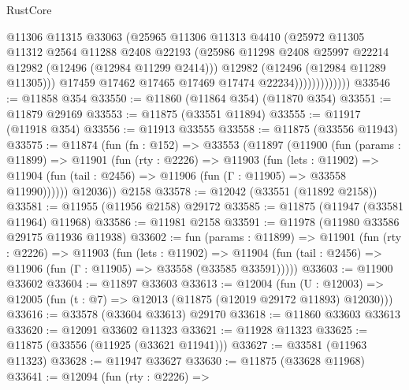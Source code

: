 \begin{lexlean}{RustCore}
\begin{coremodule}
                            @11306
                            @11315
                            @33063
                            (@25965
                              @11306
                              @11313
                              @4410
                              (@25972
                                @11305
                                @11312
                                @2564
                                @11288
                                @2408
                                @22193
                                (@25986
                                  @11298
                                  @2408
                                  @25997
                                  @22214
                                  @12982
                                  (@12496 (@12984 @11299 @2414)))
                                @12982
                                (@12496 (@12984 @11289 @11305)))
                              @17459
                              @17462
                              @17465
                              @17469
                              @17474
                              @22234)))))))))))))
@33546 := @11858 @354
@33550 := @11860 (@11864 @354) (@11870 @354)
@33551 := @11879 @29169
@33553 := @11875 (@33551 @11894)
@33555 := @11917 (@11918 @354)
@33556 := @11913 @33555
@33558 := @11875 (@33556 @11943)
@33575 := @11874
    (fun (fn : @152) =>
    @33553
      (@11897
        (@11900
          (fun (params : @11899) =>
          @11901
            (fun (rty : @2226) =>
            @11903
              (fun (lets : @11902) =>
              @11904 (fun (tail : @2456) => @11906 (fun (Γ : @11905) => @33558 @11990))))))
        @12036))
    @2158
@33578 := @12042 (@33551 (@11892 @2158))
@33581 := @11955 (@11956 @2158) @29172
@33585 := @11875 (@11947 (@33581 @11964) @11968)
@33586 := @11981 @2158
@33591 := @11978 (@11980 @33586 @29175 @11936 @11938)
@33602 := fun (params : @11899) =>
  @11901
    (fun (rty : @2226) =>
    @11903
      (fun (lets : @11902) =>
      @11904 (fun (tail : @2456) => @11906 (fun (Γ : @11905) => @33558 (@33585 @33591)))))
@33603 := @11900 @33602
@33604 := @11897 @33603
@33613 := @12004
    (fun (U : @12003) => @12005 (fun (t : @7) => @12013 (@11875 (@12019 @29172 @11893) @12030)))
@33616 := @33578 (@33604 @33613) @29170
@33618 := @11860 @33603 @33613
@33620 := @12091 @33602 @11323
@33621 := @11928 @11323
@33625 := @11875 (@33556 (@11925 (@33621 @11941)))
@33627 := @33581 (@11963 @11323)
@33628 := @11947 @33627
@33630 := @11875 (@33628 @11968)
@33641 := @12094
    (fun (rty : @2226) =>

\end{coremodule}
\end{lexlean}
